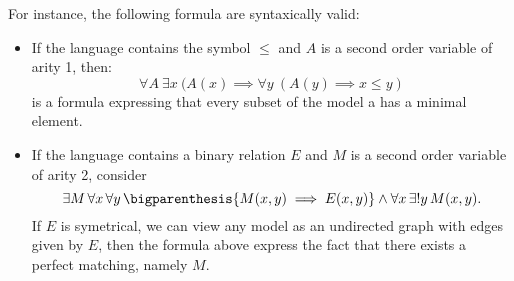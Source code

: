 For instance, the following formula are syntaxically valid:
\begin{itemize}
    \item If the language contains the symbol $\leq$
        and $A$ is a second order variable of arity 1, then:
    \[
        \forall A ~ \exists x ~
            (A(x) \implies \forall y ~
                (A(y) \implies x \leq y)
    \]
        is a formula expressing that every subset of the model
        a has a minimal element.
    \item If the language contains a binary relation $E$
        and $M$ is a second order variable of arity 2,
        consider
        \[
            \exists M\, \forall x\, \forall y \,
            \bigparenthesis{M(x, y) \implies E(x, y)}
            \wedge \forall x \, \exists! y \, M(x, y).
        \]
        If $E$ is symetrical, we can view any model as an
        undirected graph with edges given by $E$, then
        the formula above express the fact that
        there exists a perfect matching, namely $M$.
\end{itemize}


